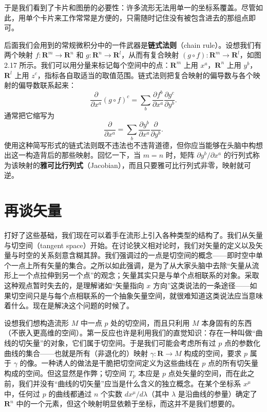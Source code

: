 于是我们看到了卡片和图册的必要性：许多流形无法用单一的坐标系覆盖。尽管如此，用单个卡片来工作常常是方便的，只需随时记住没有被包含进去的那组点即可。

后面我们会用到的常规微积分中的一件武器是\textbf{链式法则}（chain rule）。设想我们有两个映射 $f:\mathbf{R}^m\to\mathbf{R}^n$ 和 $g:\mathbf{R}^n\to\mathbf{R}^l$，从而有复合映射 $(g\circ f):\mathbf{R}^m\to\mathbf{R}^l$，如图 2.17 所示。我们可以用分量来标记每个空间中的点：$\mathbf{R}^m$ 上用 $x^a$，$\mathbf{R}^n$ 上用 $y^b$，$\mathbf{R}^l$ 上用 $z^c$，指标各自取适当的取值范围。链式法则把复合映射的偏导数与各个映射的偏导数联系起来：
\begin{equation*}
\frac{\partial}{\partial x^a}(g\circ f)^c=\sum_b \frac{\partial f^b}{\partial x^a}\frac{\partial g^c}{\partial y^b}. \tag{2.12}
\end{equation*}
通常把它缩写为
\begin{equation*}
\frac{\partial}{\partial x^a}=\sum_b \frac{\partial y^b}{\partial x^a}\frac{\partial}{\partial y^b}. \tag{2.13}
\end{equation*}
使用这种简写形式的链式法则既不违法也不违背道德，但你应当能够在头脑中构想出这一构造背后的那些映射。回忆一下，当 $m=n$ 时，矩阵 $\partial y^b/\partial x^a$ 的行列式称为该映射的\textbf{雅可比行列式}（Jacobian），而且只要雅可比行列式非零，映射就可逆。


\section{再谈矢量}

打好了这些基础，我们现在可以着手在流形上引入各种类型的结构了。我们从矢量与切空间（tangent space）开始。在讨论狭义相对论时，我们对矢量的定义以及矢量与时空的关系刻意含糊其辞。我们强调过的一点是切空间的概念——即时空中单个一点上所有矢量的集合。之所以如此强调，是为了从大家头脑中去除“矢量从流形上一个点拉伸到另一个点”的观念；矢量其实只是与单个点相联系的对象。采取这种观点暂时失去的，是理解诸如“矢量指向 $x$ 方向”这类说法的一条途径——如果切空间只是与每个点相联系的一个抽象矢量空间，就很难知道这类说法应当意味着什么。现在是解决这个问题的时候了。

设想我们想构造流形 $M$ 中一点 $p$ 处的切空间，而且只利用 $M$ 本身固有的东西（不嵌入更高维的空间）。第一反应也许是利用我们的直觉知识：存在一种叫做“曲线的切矢量”的对象，它们属于切空间。于是我们可能会考虑所有过 $p$ 点的参数化曲线的集合——也就是所有（非退化的）映射 $\gamma:\mathbf{R}\to M$ 构成的空间，要求 $p$ 属于 $\gamma$ 的像。一种诱人的做法是干脆把切空间定义为这些曲线在 $p$ 点的所有切矢量构成的空间。但这显然是作弊；切空间 $T_p$ 本应是 $p$ 点处矢量的空间，而在此之前，我们并没有“曲线的切矢量”应当是什么含义的独立概念。在某个坐标系 $x^\mu$ 中，任何过 $p$ 的曲线都通过 $n$ 个实数 $dx^\mu/d\lambda$（其中 $\lambda$ 是沿曲线的参量）确定了 $\mathbf{R}^n$ 中的一个元素，但这个映射明显依赖于坐标，而这并不是我们想要的。

